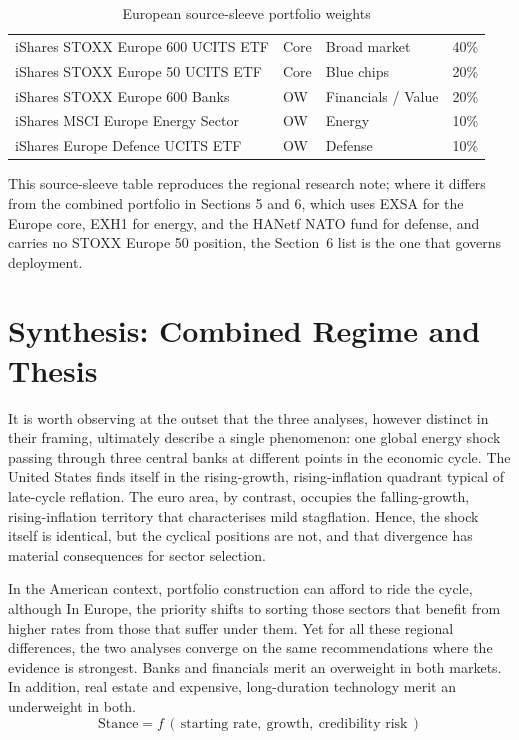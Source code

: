\documentclass[11pt,a4paper]{article}
\begin{document}
\begin{table}[htbp]
\caption{European source-sleeve portfolio weights}
\small
\begin{tabularx}{\linewidth}{L P{1.4cm} P{3.1cm} Q{1.4cm}}
\toprule
{} &  &  &  \\
\midrule
iShares STOXX Europe 600 UCITS ETF & Core & Broad market & 40\% \\
iShares STOXX Europe 50 UCITS ETF & Core & Blue chips & 20\% \\
iShares STOXX Europe 600 Banks & OW & Financials / Value & 20\% \\
iShares MSCI Europe Energy Sector & OW & Energy & 10\% \\
iShares Europe Defence UCITS ETF & OW & Defense & 10\% \\
\bottomrule
\end{tabularx}
\end{table}


This source-sleeve table reproduces the regional research note; where it differs from the combined portfolio in Sections 5 and 6, which uses EXSA for the Europe core, EXH1 for energy, and the HANetf NATO fund for defense, and carries no STOXX Europe 50 position, the Section~6 list is the one that governs deployment.

\section{Synthesis: Combined Regime and Thesis}

It is worth observing at the outset that the three analyses, however distinct in their framing, ultimately describe a single phenomenon: one global energy shock passing through three central banks at different points in the economic cycle. The United States finds itself in the rising-growth, rising-inflation quadrant typical of late-cycle reflation. The euro area, by contrast, occupies the falling-growth, rising-inflation territory that characterises mild stagflation. Hence, the shock itself is identical, but the cyclical positions are not, and that divergence has material consequences for sector selection.

In the American context, portfolio construction can afford to ride the cycle, although In Europe, the priority shifts to sorting those sectors that benefit from higher rates from those that suffer under them. Yet for all these regional differences, the two analyses converge on the same recommendations where the evidence is strongest. Banks and financials merit an overweight in both markets. In addition, real estate and expensive, long-duration technology merit an underweight in both.
\[ \text{Stance} = f\,(\, \text{starting rate},\ \text{growth},\ \text{credibility risk}\,) \]
\end{document}
